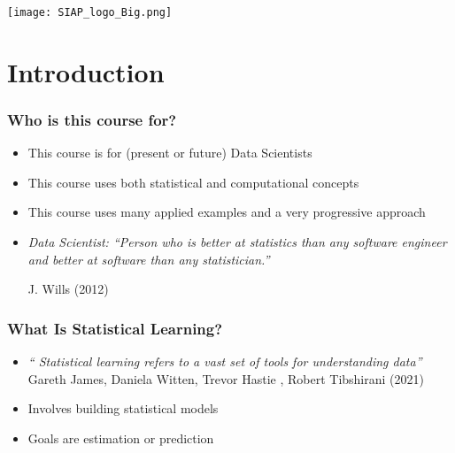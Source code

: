 \documentclass[xcolor=x11names,compress, aspectratio=169]{beamer}
\renewcommand{\(}{\begin{columns}}
\renewcommand{\)}{\end{columns}}
\newcommand{\<}[1]{\begin{column}{#1}}
\renewcommand{\>}{\end{column}}
\begin{document}
\begin{frame}
\Large{ \color{siap}{Machine Learning for Official Statistics and SDGs}}

\hspace{1cm}


\hspace{2cm}
\begin{center}

\texttt{[image: SIAP\_logo\_Big.png]}

\end{center}
\end{frame}



\section{Introduction}

\begin{frame} %
\frametitle{Who is this course for?}
\pause
\begin{itemize}[<+->]
  \item This course is for (present or future) Data Scientists
  \item This course uses both statistical and computational concepts
  \item This course uses many applied examples and a very progressive approach
  \item[]
\begin{center}
\emph{Data Scientist: “Person who is better at statistics than any software engineer and better at software than any statistician.” }
\end{center}
\scriptsize{J. Wills (2012)}
\end{itemize}
\end{frame}

\begin{frame} %
\frametitle{What Is Statistical Learning?}
\pause
\begin{itemize}[<+->]
\item[]
\begin{center}
\emph{`` Statistical learning refers to a vast set of tools for understanding data''}\\

{\scriptsize Gareth James,  Daniela Witten, Trevor Hastie ,  Robert Tibshirani (2021)}
\end{center}
  \item<+->Involves building statistical models
  \item<+-> Goals are estimation or prediction
 \end{itemize}
\end{frame}
\end{document}
